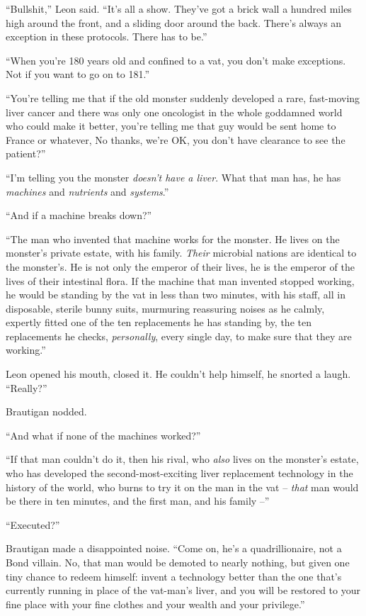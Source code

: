 “Bullshit,” Leon said. “It's all a show. They've got a brick wall 
a hundred miles high around the front, and a sliding door around the 
back. There's always an exception in these protocols. There has to 
be.”

“When you're 180 years old and confined to a vat, you don't make 
exceptions. Not if you want to go on to 181.”

“You're telling me that if the old monster suddenly developed a rare, 
fast-moving liver cancer and there was only one oncologist in the whole 
goddamned world who could make it better, you're telling me that guy 
would be sent home to France or whatever, No thanks, we're OK, you 
don't have clearance to see the patient?”

“I'm telling you the monster \emph{doesn't have a liver}. What that 
man has, he has \emph{machines} and \emph{nutrients} and 
\emph{systems}.”

“And if a machine breaks down?”

“The man who invented that machine works for the monster. He lives on 
the monster's private estate, with his family. \emph{Their} microbial 
nations are identical to the monster's. He is not only the emperor of 
their lives, he is the emperor of the lives of their intestinal flora. 
If the machine that man invented stopped working, he would be standing 
by the vat in less than two minutes, with his staff, all in disposable, 
sterile bunny suits, murmuring reassuring noises as he calmly, expertly 
fitted one of the ten replacements he has standing by, the ten 
replacements he checks, \emph{personally}, every single day, to make 
sure that they are working.”

Leon opened his mouth, closed it. He couldn't help himself, he snorted 
a laugh. “Really?”

Brautigan nodded.

“And what if none of the machines worked?”

“If that man couldn't do it, then his rival, who \emph{also} lives on 
the monster's estate, who has developed the second-most-exciting liver 
replacement technology in the history of the world, who burns to try it 
on the man in the vat -- \emph{that} man would be there in ten minutes, 
and the first man, and his family --”

“Executed?”

Brautigan made a disappointed noise. “Come on, he's a 
quadrillionaire, not a Bond villain. No, that man would be demoted to 
nearly nothing, but given one tiny chance to redeem himself: invent a 
technology better than the one that's currently running in place of the 
vat-man's liver, and you will be restored to your fine place with your 
fine clothes and your wealth and your privilege.”

